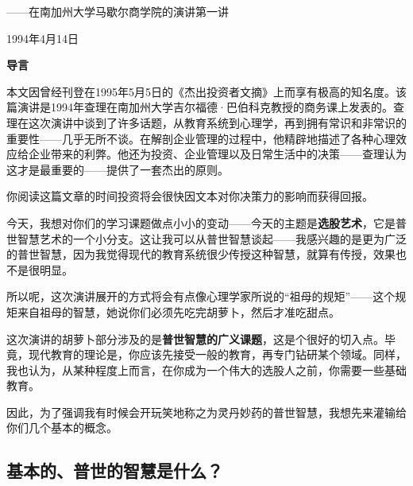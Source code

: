 \cleardoublepage
\renewcommand{\bookchapter}{1}

{\kaishu{}\centering ——在南加州大学马歇尔商学院的演讲第一讲\par}

{\kaishu\raggedleft 1994年4月14日\par}

\begin{LectureIntro}
\textbf{导言}
\par

{\kaishu 本文因曾经刊登在1995年5月5日的《杰出投资者文摘》上而享有极高的知名度。该篇演讲是1994年查理在南加州大学吉尔福德·巴伯科克教授的商务课上发表的。查理在这次演讲中谈到了许多话题，从教育系统到心理学，再到拥有常识和非常识的重要性——几乎无所不谈。在解剖企业管理的过程中，他精辟地描述了各种心理效应给企业带来的利弊。他还为投资、企业管理以及日常生活中的决策——查理认为这才是最重要的——提供了一套杰出的原则。}
\par

{\kaishu 你阅读这篇文章的时间投资将会很快因文本对你决策力的影响而获得回报。}
\par
\end{LectureIntro}

\clearpage
今天，我想对你们的学习课题做点小小的变动——今天的主题是\textbf{选股艺术}，它是普世智慧艺术的一个小分支。这让我可以从普世智慧谈起——我感兴趣的是更为广泛的普世智慧，因为我觉得现代的教育系统很少传授这种智慧，就算有传授，效果也不是很明显。
\par

所以呢，这次演讲展开的方式将会有点像心理学家所说的“祖母的规矩”——这个规矩来自祖母的智慧，她说你们必须先吃完胡萝卜，然后才准吃甜点。
\par

这次演讲的胡萝卜部分涉及的是\textbf{普世智慧的广义课题}，这是个很好的切入点。毕竟，现代教育的理论是，你应该先接受一般的教育，再专门钻研某个领域。同样，我也认为，从某种程度上而言，在你成为一个伟大的选股人之前，你需要一些基础教育。
\par

因此，为了强调我有时候会开玩笑地称之为灵丹妙药的普世智慧，我想先来灌输给你们几个基本的概念。
\par

\clearpage
\subsection*{基本的、普世的智慧是什么？}


